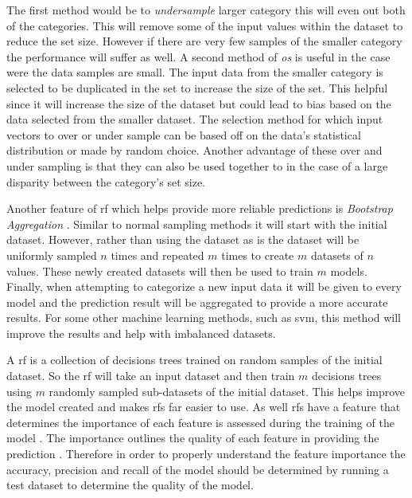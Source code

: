  
The first method would be to \textit{undersample} larger category this will even out both of the categories. This will remove some of the input values within the dataset to reduce the set size. However if there are very few samples of the smaller category the performance will suffer as well. A second method of \textit{\gls{os}} is useful in the case were the data samples are small. The input data from the smaller category is selected to be duplicated in the set to increase the size of the set. This helpful since it will increase the size of the dataset but could lead to bias based on the data selected from the smaller dataset. The selection method for which input vectors to over or under sample can be based off on the data's statistical distribution or made by random choice. Another advantage of these over and under sampling is that they can also be used together to in the case of a large disparity between the category's set size. 

Another feature of \gls{rf} which helps provide more reliable predictions is \textit{Bootstrap Aggregation} \cite{Westland2011}. Similar to normal sampling methods it will start with the initial dataset. However, rather than using the dataset as is the dataset will be uniformly sampled $n$ times and repeated $m$ times to create $m$ datasets of $n$ values. These newly created datasets will then be used to train $m$ models. Finally, when attempting to categorize a new input data it will be given to every model and the prediction result will be aggregated to provide a more accurate results. For some other machine learning methods, such as \gls{svm}, this method will improve the results and help with imbalanced datasets.

A \gls{rf} is a collection of decisions trees trained on random samples of the initial dataset. So the \gls{rf} will take an input dataset and then train $m$ decisions trees using $m$ randomly sampled sub-datasets of the initial dataset. This helps improve the model created and makes \gls{rf}s far easier to use. As well \gls{rf}s have a feature that determines the importance of each feature is assessed during the training of the model \cite{Westland2011}. The importance outlines the quality of each feature in providing the prediction \cite{Verikas2011}. Therefore in order to properly understand the feature importance the accuracy, precision and recall of the model should be determined by running a test dataset to determine the quality of the model.


